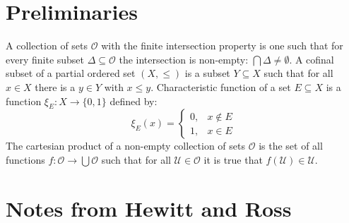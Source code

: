 \section{Preliminaries}
    A collection of sets $\mathcal{O}$ with the finite intersection property is
    one such that for every finite subset $\Delta\subseteq\mathcal{O}$ the
    intersection is non-empty: $\bigcap\Delta\ne\emptyset$. A cofinal subset of
    a partial ordered set $(X,\leq)$ is a subset $Y\subseteq{X}$ such that for
    all $x\in{X}$ there is a $y\in{Y}$ with $x\leq{y}$. Characteristic function
    of a set $E\subseteq{X}$ is a function $\xi_{E}:X\rightarrow\{0,1\}$ defined
    by:
    \begin{equation}
        \xi_{E}(x)=
        \begin{cases}
            0,&x\notin{E}\\
            1,&x\in{E}
        \end{cases}
    \end{equation}
    The cartesian product of a non-empty collection of sets $\mathcal{O}$ is the
    set of all functions $f:\mathcal{O}\rightarrow\bigcup\mathcal{O}$ such that
    for all $\mathcal{U}\in\mathcal{O}$ it is true that
    $f(\mathcal{U})\in\mathcal{U}$.

\section{Notes from Hewitt and Ross}


